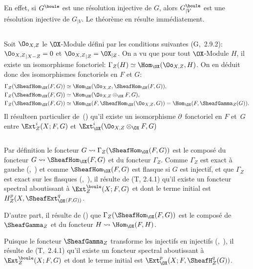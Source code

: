 En effet, si $G^\boule$ est une r\'esolution injective de $G$, alors $G^\boule_{|V}$ est une r\'esolution injective de $G_{|V}$. Le th\'eor\`eme en r\'esulte imm\'ediatement.

\subsection{} \label{VI.1.4}
Soit $\Oo_{X, Z}$ le $\OX$-Module d\'efini par les conditions suivantes (G,~2.9.2): ${\Oo_{X, Z}}_{|X{-} Z}=0$ et ${\Oo_{X, Z}}_{|Z}={\OX}_{|Z}$. On a vu que pour tout $\OX$-Module $H$, il existe un isomorphisme fonctoriel: $\Gamma_Z(H)\simeq \Hom_{\OX}(\Oo_{X, Z}, H)$. On en d\'eduit donc des isomorphismes fonctoriels en $F$ et $G$: \setcounter{equation}{0}
\begin{align}
\label{VI.1.4.1}
\Gamma_Z(\SheafHom_{\OX}(F, G)) &\simeq \Hom_{\OX}(\Oo_{X, Z}, \SheafHom_{\OX}(F, G)),\\
\label{VI.1.4.2} \Gamma_Z(\SheafHom_{\OX}(F, G)) &\simeq \Hom_{\OX}(\Oo_{X, Z}\otimes_{\OX} F, G),\\
\label{VI.1.4.3} \Gamma_Z(\SheafHom_{\OX}(F, G)) &\simeq \Hom_{\OX}(F, \SheafHom_{\OX}(\Oo_{X, Z}, G))=\Hom_{\OX}(F, \SheafGamma_Z(G)).
\end{align}
Il r\'esulte\pageoriginale en particulier de~() qu'il existe un isomorphisme $\partial$~fonctoriel en $F$ et~$G$ entre $\Ext_{Z}^i(X;F, G)$ et $\Ext_{{\OX}}^i(\Oo_{X, Z}\otimes_{\OX} F, G)$

\subsection{} \label{VI.1.5}
Par d\'efinition le foncteur $G \rightsquigarrow \Gamma_Z(\SheafHom_{\OX}(F, G))$ est le compos\'e du foncteur $G \rightsquigarrow\SheafHom_{\OX}(F, G)$ et du foncteur $\Gamma_Z$. Comme $\Gamma_Z$ est exact \`a gauche (,~) et comme $\SheafHom_{\OX}(F, G)$ est flasque si $G$ est injectif, et que $\Gamma_Z$ est exact sur les flasques (,~), il r\'esulte de (T, 2.4.1) qu'il existe un foncteur spectral aboutissant \`a $\Ext_{Z}^\boule(X;F, G)$ et dont le terme initial est $H_Z^p(X, \SheafExt_{\OX}^q{}_{(F, G))}$.

D'autre part, il r\'esulte de () que $\Gamma_Z(\SheafHom_{\OX}(F, G))$ est le compos\'e de $\SheafGamma_Z$ et du foncteur $H \rightsquigarrow \Hom_{\OX}(F, H)$.

Puisque le foncteur $\SheafGamma_Z$ transforme les injectifs en injectifs (,~), il r\'esulte de (T,~2.4.1) qu'il existe un foncteur spectral aboutissant \`a $\Ext_{Z}^\boule(X;F, G)$ et dont le terme initial est $\Ext_{\OX}^p(X;F, \SheafH_Z^q(G))$.

